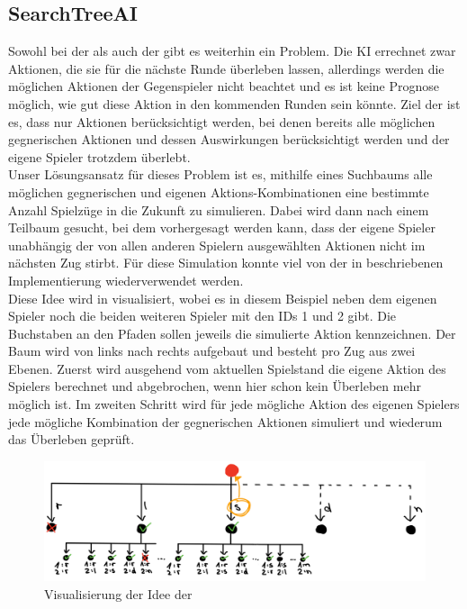 \subsection{SearchTreeAI}
\label{subsec:searchtree-ai}

Sowohl bei der  als auch der  gibt es weiterhin ein Problem.
Die \ac{KI} errechnet zwar Aktionen, die sie für die nächste Runde überleben lassen, allerdings werden die möglichen
Aktionen der Gegenspieler nicht beachtet und es ist keine Prognose möglich, wie gut diese Aktion in den kommenden Runden
sein könnte.
Ziel der  ist es, dass nur Aktionen berücksichtigt werden, bei denen bereits alle möglichen
gegnerischen Aktionen und dessen Auswirkungen berücksichtigt werden und der eigene Spieler trotzdem überlebt. \\

Unser Lösungsansatz für dieses Problem ist es, mithilfe eines Suchbaums alle möglichen gegnerischen und eigenen
Aktions-Kombinationen eine bestimmte Anzahl Spielzüge in die Zukunft zu simulieren. 
Dabei wird dann nach einem Teilbaum gesucht, bei dem
vorhergesagt werden kann, dass der eigene Spieler unabhängig der von allen anderen Spielern ausgewählten Aktionen nicht
im nächsten Zug stirbt.
Für diese Simulation konnte viel von der in  beschriebenen Implementierung
wiederverwendet werden. \\

Diese Idee wird in  visualisiert, wobei es in diesem Beispiel neben dem
eigenen Spieler noch die beiden weiteren Spieler mit den IDs 1 und 2 gibt.
Die Buchstaben an den Pfaden sollen jeweils die simulierte Aktion kennzeichnen.
Der Baum wird von links nach rechts aufgebaut und besteht pro Zug aus zwei Ebenen.
Zuerst wird ausgehend vom aktuellen Spielstand die eigene Aktion des Spielers berechnet und abgebrochen, wenn hier schon
kein Überleben mehr möglich ist.
Im zweiten Schritt wird für jede mögliche Aktion des eigenen Spielers jede mögliche Kombination der gegnerischen
Aktionen simuliert und wiederum das Überleben geprüft. \\

\begin{figure}[htb]
\centering
\includegraphics[width=\textwidth]{Bilder/SearchTreeAIVisualisierung.jpg}
\caption{Visualisierung der Idee der }
\label{fig:SearchTreeAIVisualisierung}
\end{figure}

